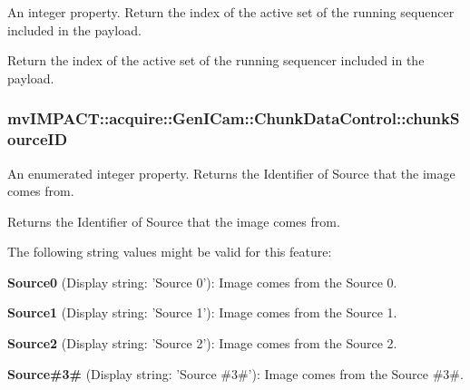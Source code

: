 An integer property. Return the index of the active set of the running sequencer included in the payload. 

Return the index of the active set of the running sequencer included in the payload. \hypertarget{classmv_i_m_p_a_c_t_1_1acquire_1_1_gen_i_cam_1_1_chunk_data_control_a014b54e61bfa874ae1b64cf7de60a4cf}{
\subsubsection[{chunk\+Source\+I\+D}]{ mv\+I\+M\+P\+A\+C\+T\+::acquire\+::\+Gen\+I\+Cam\+::\+Chunk\+Data\+Control\+::chunk\+Source\+I\+D}}\label{classmv_i_m_p_a_c_t_1_1acquire_1_1_gen_i_cam_1_1_chunk_data_control_a014b54e61bfa874ae1b64cf7de60a4cf}


An enumerated integer property. Returns the Identifier of Source that the image comes from. 

Returns the Identifier of Source that the image comes from.

The following string values might be valid for this feature\+:
\begin{DoxyItemize}
\item {\bfseries Source0} (Display string\+: 'Source 0')\+: Image comes from the Source 0.
\item {\bfseries Source1} (Display string\+: 'Source 1')\+: Image comes from the Source 1.
\item {\bfseries Source2} (Display string\+: 'Source 2')\+: Image comes from the Source 2.
\item {\bfseries Source\#3\#} (Display string\+: 'Source \#3\#')\+: Image comes from the Source \#3\#.
\end{DoxyItemize}


